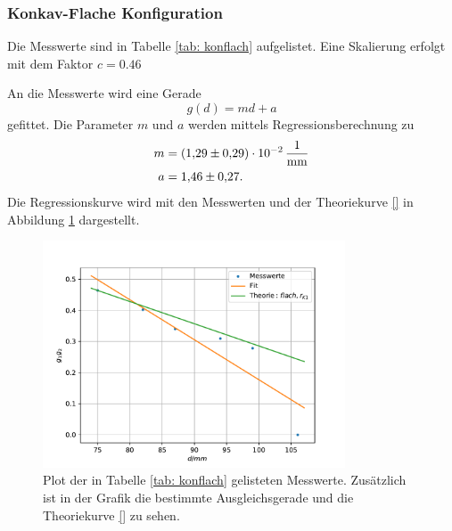 \subsubsection{Konkav-Flache Konfiguration}
Die Messwerte sind in Tabelle \ref{tab: konflach} aufgelistet.
Eine Skalierung erfolgt mit dem Faktor $c=\num{0.46}$

An die Messwerte wird eine Gerade
\begin{equation*}
  g(d)=md+a
\end{equation*}
gefittet. Die Parameter $m$ und $a$ werden mittels Regressionsberechnung zu
\begin{align}
  \label{eq: konflach}
  \begin{aligned}
    m&=\SI{1.29 \pm 0.29 e-2}{\per\milli\meter}\\
    a&=\num{1.46\pm0.27}.
  \end{aligned}
\end{align}
Die Regressionskurve wird mit den Messwerten und der Theoriekurve \eqref{} in Abbildung \ref{fig: konflach} dargestellt.

\begin{figure}[h!]
  \centering
  \includegraphics[width=0.8\textwidth]{../Messdaten/plots/konflach.pdf}
  \caption{Plot der in Tabelle \ref{tab: konflach} gelisteten Messwerte. Zusätzlich ist in der Grafik die bestimmte Ausgleichsgerade und die Theoriekurve \eqref{} zu sehen.}
  \label{fig: konflach}
\end{figure}
\FloatBarrier
